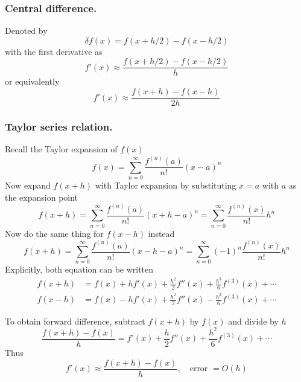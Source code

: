 \documentclass[../../../main.tex]{subfiles}
\begin{document}
\subsubsection{Central difference.}
Denoted by
\begin{equation*}
    \delta f(x)=f(x+h/2)-f(x-h/2)
\end{equation*}
with the first derivative as
\begin{equation*}
    f'(x)\approx \frac{f(x+h/2)-f(x-h/2)}{h}
\end{equation*}
or equivalently
\begin{equation*}
    f'(x)\approx \frac{f(x+h)-f(x-h)}{2h}
\end{equation*}

\subsubsection{Taylor series relation.}
Recall the Taylor expansion of $f(x)$
\begin{equation*}
    f(x) = \sum_{n=0}^{\infty} \frac{f^{(n)}(a)}{n!}(x-a)^n
\end{equation*}
Now expand $f(x+h)$ with Taylor expansion by substituting $x=a$ with $a$ as the expansion point
\begin{equation*}
    f(x+h) = \sum_{n=0}^{\infty} \frac{f^{(n)}(a)}{n!}(x+h-a)^n= \sum_{n=0}^{\infty} \frac{f^{(n)}(x)}{n!}h^n
\end{equation*}
Now do the same thing for $f(x-h)$ instead
\begin{equation*}
    f(x+h) = \sum_{n=0}^{\infty} \frac{f^{(n)}(a)}{n!}(x-h-a)^n= \sum_{n=0}^{\infty} (-1)^n\frac{f^{(n)}(x)}{n!}h^n
\end{equation*}
Explicitly, both equation can be written
\begin{align*}
    f(x+h) & =  f(x) + h f'(x) + \frac{h^2}{2} f''(x) + \frac{h^3}{6} f^{(3)}(x) + \cdots \\
    f(x-h) & =  f(x) - h f'(x) + \frac{h^2}{2} f''(x) - \frac{h^3}{6} f^{(3)}(x) + \cdots
\end{align*}

To obtain forward difference, subtract $f(x+h)$ by $f(x)$ and divide by $h$
\begin{equation*}
    \frac{f(x+h) - f(x)}{h} = f'(x) + \frac{h}{2} f''(x) + \frac{h^2}{6} f^{(3)}(x) +\cdots
\end{equation*}
Thus
\begin{equation*}
    f'(x) \approx \frac{f(x+h) - f(x)}{h}, \quad \text{error } = O(h)
\end{equation*}
\end{document}
